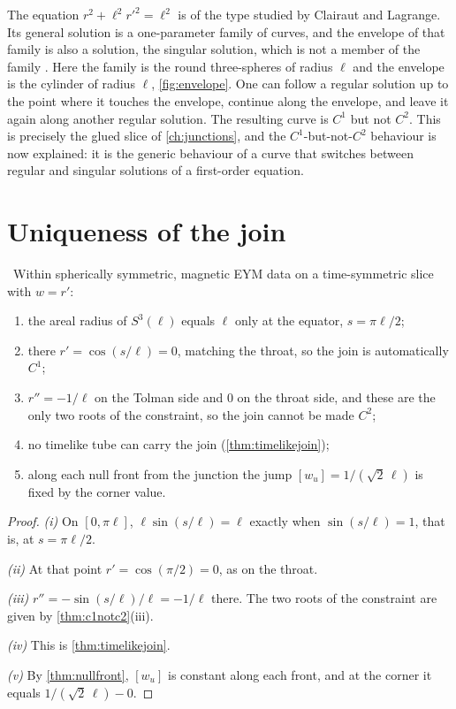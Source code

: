 The equation $r^2+\ell^2r'^2=\ell^2$ is of the type studied by Clairaut and Lagrange. Its general solution is a one-parameter family of curves, and the envelope of that family is also a solution, the singular solution, which is not a member of the family \cite{Ince}. Here the family is the round three-spheres of radius $\ell$ and the envelope is the cylinder of radius $\ell$, \cref{fig:envelope}. One can follow a regular solution up to the point where it touches the envelope, continue along the envelope, and leave it again along another regular solution. The resulting curve is $C^1$ but not $C^2$. This is precisely the glued slice of \cref{ch:junctions}, and the $C^1$-but-not-$C^2$ behaviour is now explained: it is the generic behaviour of a curve that switches between regular and singular solutions of a first-order equation.

\section{Uniqueness of the join}

\begin{theorem}\label{thm:joinunique}\ver\
Within spherically symmetric, magnetic EYM data on a time-symmetric slice with $w=r'$:
\begin{enumerate}[label=(\roman*)]
\item the areal radius of $S^3(\ell)$ equals $\ell$ only at the equator, $s=\pi\ell/2$;
\item there $r'=\cos(s/\ell)=0$, matching the throat, so the join is automatically $C^1$;
\item $r''=-1/\ell$ on the Tolman side and $0$ on the throat side, and these are the only two roots of the constraint, so the join cannot be made $C^2$;
\item no timelike tube can carry the join (\cref{thm:timelikejoin});
\item along each null front from the junction the jump $[w_u]=1/(\sqrt2\,\ell)$ is fixed by the corner value.
\end{enumerate}
\end{theorem}
\begin{proof}
\emph{(i)} On $[0,\pi\ell]$, $\ell\sin(s/\ell)=\ell$ exactly when $\sin(s/\ell)=1$, that is, at $s=\pi\ell/2$.

\emph{(ii)} At that point $r'=\cos(\pi/2)=0$, as on the throat.

\emph{(iii)} $r''=-\sin(s/\ell)/\ell=-1/\ell$ there. The two roots of the constraint are given by \cref{thm:c1notc2}(iii).

\emph{(iv)} This is \cref{thm:timelikejoin}.

\emph{(v)} By \cref{thm:nullfront}, $[w_u]$ is constant along each front, and at the corner it equals $1/(\sqrt2\,\ell)-0$.
\end{proof}


